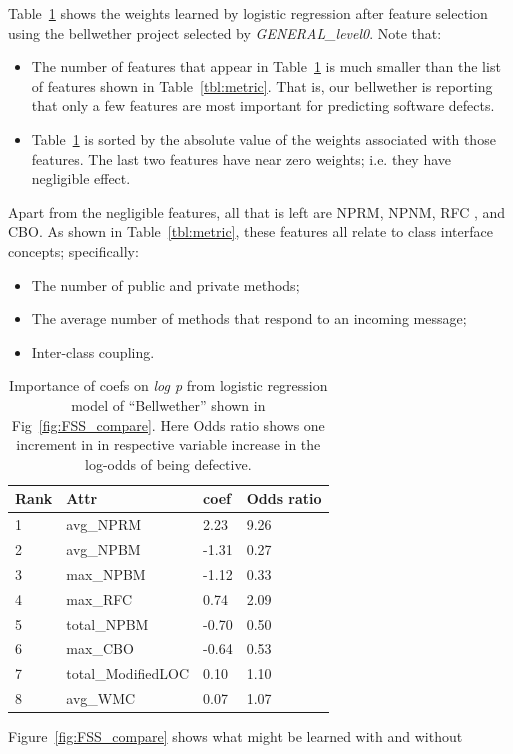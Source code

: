 \documentclass[10pt,journal,compsoc]{IEEEtran}
\newcommand{\fig}[1]{Figure~\ref{fig:#1}}
\newcommand{\bi}{\begin{itemize}}
\newcommand{\ei}{\end{itemize}}
\begin{document}
Table~\ref{tbl:coefs}  shows the weights learned by logistic
regression after feature selection using the bellwether project
selected by {\em GENERAL\_level0}. Note that:
\bi
\item
The number of features that appear in Table~\ref{tbl:coefs}  is much smaller than the list of features shown in Table~\ref{tbl:metric}.
That is, our bellwether is reporting that only a few features
are most important for predicting software defects.
\item
Table~\ref{tbl:coefs}  is sorted by the absolute value of the weights
associated with those features. The last two features have near
zero weights; i.e. they have negligible effect.
\ei
Apart from the negligible features, all that is left are NPRM, NPNM, RFC , and CBO. As shown in Table~\ref{tbl:metric}, these features
all relate to class interface concepts; specifically: 
\bi
\item
The number of public and private methods; 
\item
The  average number of methods that respond to an incoming message; 
\item
Inter-class coupling. 
\ei
\begin{table}[!t]
\centering
\begin{tabular}{|l|l|l|l|} \hline
Rank & Attr               & coef  & Odds ratio \\ \hline
1    & avg\_NPRM          & 2.23  & 9.26      \\ \hline
2    & avg\_NPBM          & -1.31 & 0.27      \\ \hline
3    & max\_NPBM          & -1.12 & 0.33      \\ \hline
4    & max\_RFC           & 0.74  & 2.09      \\ \hline 
5    & total\_NPBM        & -0.70 & 0.50      \\ \hline
6    & max\_CBO           & -0.64 & 0.53      \\ \hline
7    & total\_ModifiedLOC & 0.10  & 1.10      \\ \hline
8    & avg\_WMC           & 0.07  & 1.07     \\ \hline
\end{tabular}

\caption{Importance of coefs on \textit{log p} from logistic regression model of ``Bellwether'' shown in Fig~\ref{fig:FSS_compare}. Here Odds ratio shows one increment in in respective variable increase in the log-odds of being defective.}\label{tbl:coefs}
\end{table}
\fig{FSS_compare} shows what might be learned with and without
\end{document}
